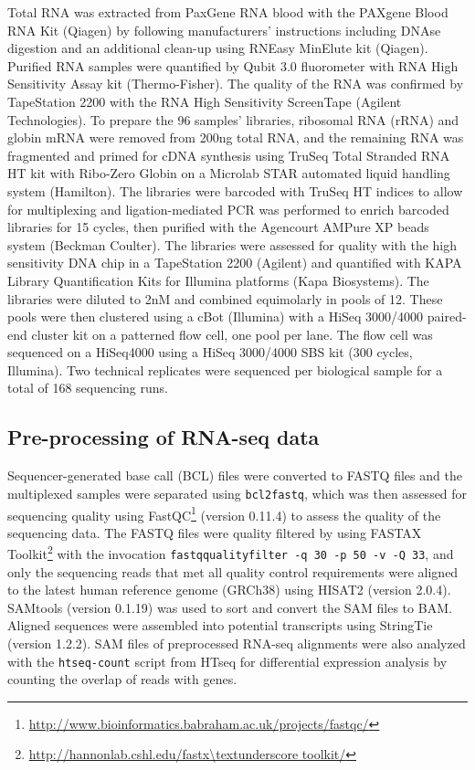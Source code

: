 Total RNA was extracted from PaxGene RNA blood with the PAXgene Blood RNA Kit (Qiagen) by following manufacturers’ instructions including DNAse digestion and an additional clean-up using RNEasy MinElute kit (Qiagen). Purified RNA samples were quantified by Qubit 3.0 fluorometer with RNA High Sensitivity Assay kit (Thermo-Fisher). The quality of the RNA was confirmed by TapeStation 2200 with the RNA High Sensitivity ScreenTape (Agilent Technologies). To prepare the 96 samples’ libraries, ribosomal RNA (rRNA) and globin mRNA were removed from 200ng total RNA, and the remaining RNA was fragmented and primed for cDNA synthesis using TruSeq Total Stranded RNA HT kit with Ribo-Zero Globin on a Microlab STAR automated liquid handling system (Hamilton). The libraries were barcoded with TruSeq HT indices to allow for multiplexing and ligation-mediated PCR was performed to enrich barcoded libraries for 15 cycles, then purified with the Agencourt AMPure XP beads system (Beckman Coulter). The libraries were assessed for quality with the high sensitivity DNA chip in a TapeStation 2200 (Agilent) and quantified with KAPA Library Quantification Kits for Illumina platforms (Kapa Biosystems). The libraries were diluted to 2nM and combined equimolarly in pools of 12. These pools were then clustered using a cBot (Illumina) with a HiSeq 3000/4000 paired-end cluster kit on a patterned flow cell, one pool per lane. The flow cell was sequenced on a HiSeq4000 using a HiSeq 3000/4000 SBS kit (300 cycles, Illumina). Two technical replicates were sequenced per biological sample for a total of 168 sequencing runs.

\subsection{Pre-processing of RNA-seq data}

Sequencer-generated base call (BCL) files were converted to FASTQ files and the multiplexed samples were separated using \texttt{bcl2fastq}, which was then assessed for sequencing quality using FastQC\footnote{\url{http://www.bioinformatics.babraham.ac.uk/projects/fastqc/}} (version 0.11.4) to assess the quality of the sequencing data. The FASTQ files were quality filtered by using FASTAX Toolkit\footnote{\url{http://hannonlab.cshl.edu/fastx\textunderscore toolkit/}} with the invocation \texttt{fastq\textunderscore quality\textunderscore filter -q 30 -p 50 -v -Q 33}, and only the sequencing reads that met all quality control requirements were aligned to the latest human reference genome (GRCh38) using HISAT2\autocite{Kim2015} (version 2.0.4). SAMtools\autocite{Li2009} (version 0.1.19) was used to sort and convert the SAM files to BAM. Aligned sequences were assembled into potential transcripts using StringTie\autocite{Pertea2015} (version 1.2.2). SAM files of preprocessed RNA-seq alignments were also analyzed with the \texttt{htseq-count} script from HTseq\autocite{Anders2015} for differential expression analysis by counting the overlap of reads with genes.

